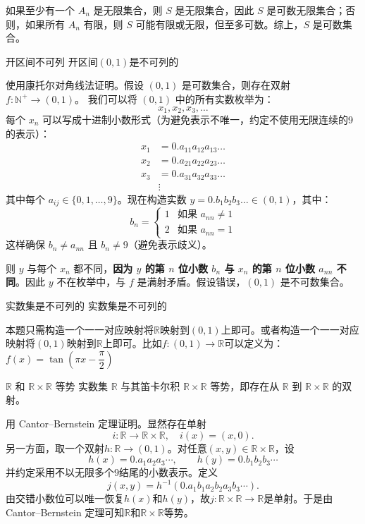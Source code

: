 \documentclass[lang=cn,11pt]{elegantbook}
\begin{document}
如果至少有一个 $A_n$ 是无限集合，则 $S$ 是无限集合，因此 $S$ 是可数无限集合；否则，如果所有 $A_n$ 有限，则 $S$ 可能有限或无限，但至多可数。综上，$S$ 是可数集合。
\begin{theorem}{开区间不可列}
    开区间$(0,1)$是不可列的
\end{theorem}
使用康托尔对角线法证明。假设 $(0,1)$ 是可数集合，则存在双射 $f: \mathbb{N}^+ \to (0,1)$。
我们可以将 $(0,1)$ 中的所有实数枚举为：
\[
x_1, x_2, x_3, \dots
\]
每个 $x_n$ 可以写成十进制小数形式（为避免表示不唯一，约定不使用无限连续的9的表示）：
\[
\begin{aligned}
x_1 &= 0.a_{11}a_{12}a_{13}\dots \\
x_2 &= 0.a_{21}a_{22}a_{23}\dots \\
x_3 &= 0.a_{31}a_{32}a_{33}\dots \\
&\vdots
\end{aligned}
\]
其中每个 $a_{ij} \in \{0,1,\dots,9\}$。现在构造实数 $y = 0.b_1b_2b_3\dots \in (0,1)$，其中：
\[
b_n = 
\begin{cases}
1 & \text{如果 } a_{nn} \neq 1 \\
2 & \text{如果 } a_{nn} = 1
\end{cases}
\]
这样确保 $b_n \neq a_{nn}$ 且 $b_n \neq 9$（避免表示歧义）。

则 $y$ 与每个 $x_n$ 都不同，\textbf{因为 $y$ 的第 $n$ 位小数 $b_n$ 与 $x_n$ 的第 $n$ 位小数 $a_{nn}$ 不同}。因此 $y$ 不在枚举中，与 $f$ 是满射矛盾。假设错误，$(0,1)$ 是不可数集合。
\begin{theorem}{实数集是不可列的}
实数集是不可列的
\end{theorem}
本题只需构造一个一一对应映射将$\mathbb{R}$映射到$(0,1)$上即可。或者构造一个一一对应映射将$(0,1)$映射到$\mathbb{R}$上即可。比如$f: (0,1) \to \mathbb{R}$可以定义为：$f(x)=\tan\left(\pi x-\dfrac{\pi}{2}\right)$
\begin{theorem}{$\mathbb{R}$ 和 $\mathbb{R} \times \mathbb{R}$ 等势}{}
    实数集 $\mathbb{R}$ 与其笛卡尔积 $\mathbb{R} \times \mathbb{R}$ 等势，即存在从 $\mathbb{R}$ 到 $\mathbb{R} \times \mathbb{R}$ 的双射。
\end{theorem}
用 Cantor--Bernstein 定理证明。显然存在单射
\[
i:\mathbb{R}\to\mathbb{R}\times\mathbb{R},\quad i(x)=(x,0).
\]
另一方面，取一个双射$h:\mathbb{R}\to(0,1)$。对任意$(x,y)\in\mathbb{R}\times\mathbb{R}$，设
\[
h(x)=0.a_1a_2a_3\cdots,\qquad h(y)=0.b_1b_2b_3\cdots
\]
并约定采用不以无限多个9结尾的小数表示。定义
\[
j(x,y)=h^{-1}(0.a_1b_1a_2b_2a_3b_3\cdots).
\]
由交错小数位可以唯一恢复$h(x)$和$h(y)$，故$j:\mathbb{R}\times\mathbb{R}\to\mathbb{R}$是单射。于是由 Cantor--Bernstein 定理可知$\mathbb{R}$和$\mathbb{R}\times\mathbb{R}$等势。
\end{document}
